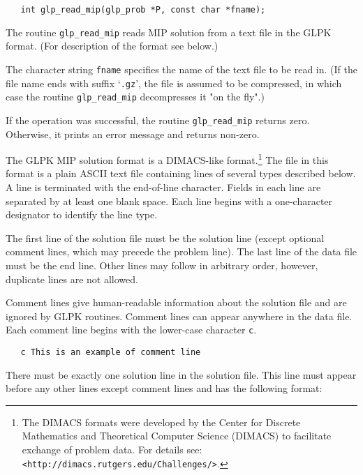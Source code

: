 \synopsis

\begin{verbatim}
   int glp_read_mip(glp_prob *P, const char *fname);
\end{verbatim}

\description

The routine \verb|glp_read_mip| reads MIP solution from a text file in
the GLPK format. (For description of the format see below.)

The character string \verb|fname| specifies the name of the text file
to be read in. (If the file name ends with suffix `\verb|.gz|', the
file is assumed to be compressed, in which case the routine
\verb|glp_read_mip| decompresses it "on the fly".)

\returns

If the operation was successful, the routine \verb|glp_read_mip|
returns zero. Otherwise, it prints an error message and returns
non-zero.


The GLPK MIP solution format is a DIMACS-like format.\footnote{The
DIMACS formats were developed by the Center for Discrete Mathematics
and Theoretical Computer Science (DIMACS) to facilitate exchange of
problem data. For details see:
{\tt <http://dimacs.rutgers.edu/Challenges/>}. }
The file in this format is a plain ASCII text file containing lines of
several types described below. A line is terminated with the
end-of-line character. Fields in each line are separated by at least
one blank space. Each line begins with a one-character designator to
identify the line type.

The first line of the solution file must be the solution line (except
optional comment lines, which may precede the problem line). The last
line of the data file must be the end line. Other lines may follow in
arbitrary order, however, duplicate lines are not allowed.

 Comment lines give human-readable information
about the solution file and are ignored by GLPK routines. Comment lines
can appear anywhere in the data file. Each comment line begins with the
lower-case character \verb|c|.

\begin{verbatim}
   c This is an example of comment line
\end{verbatim}

 There must be exactly one solution line in the
solution file. This line must appear before any other lines except
comment lines and has the following format:

